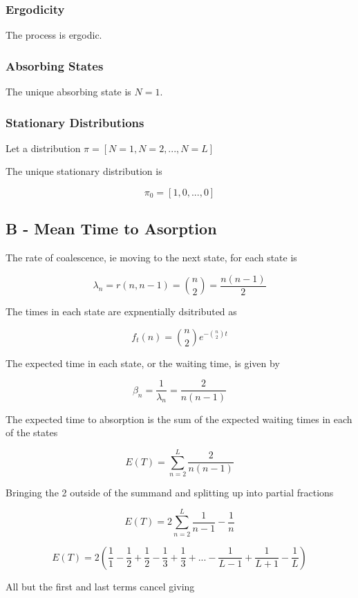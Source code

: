 \documentclass{article}
\begin{document}
\subsubsection{Ergodicity}

The process is ergodic.

\subsubsection{Absorbing States}

The unique absorbing state is $N = 1$.

\subsubsection{Stationary Distributions}

Let a distribution $\pi = [N=1, N=2,... ,N=L]$

The unique stationary distribution is 

$$\pi_0 = [1,0,...,0]$$

\subsection{B - Mean Time to Asorption}

The rate of coalescence, ie moving to the next state, for each state is

$$\lambda_n = r(n,n-1) = {n\choose 2} = \frac{n(n-1)}{2}$$

The times in each state are expnentially dsitributed as

$$f_t(n) = {n \choose 2} e^{-{n \choose 2}t}$$

The expected time in each state, or the waiting time, is given by 

$$\beta_n = \dfrac{1}{\lambda_n} = \frac{2}{n(n-1)}$$

The expected time to absorption is the sum of the expected waiting times in each of the states

$$E(T) = \sum_{n=2}^L\frac{2}{n(n-1)}$$

Bringing the 2 outside of the summand and splitting up into partial fractions

$$E(T) = 2\sum_{n=2}^L\frac{1}{n-1} - \frac{1}{n}$$


$$E(T) = 2(\frac{1}{1}-\frac{1}{2}+\frac{1}{2}-\frac{1}{3} + \frac{1}{3} + ... - \frac{1}{L-1} + \frac{1}{L+1} - \frac{1}{L})$$

All but the first and last terms cancel giving
\end{document}

